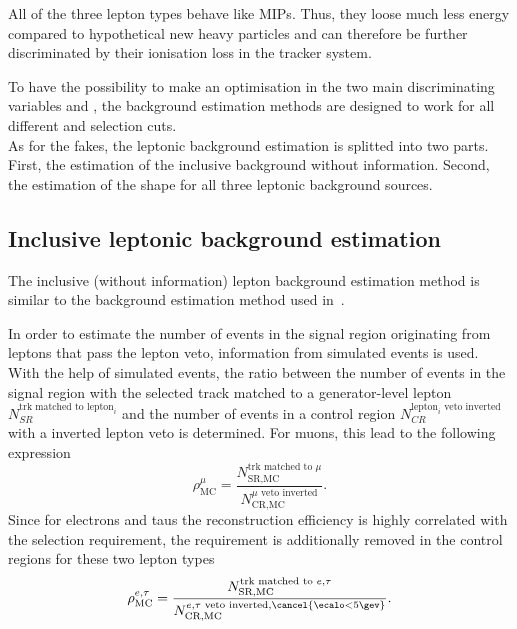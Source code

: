 All of the three lepton types behave like MIPs.
Thus, they loose much less energy compared to hypothetical new heavy particles and can therefore be further discriminated by their ionisation loss in the tracker system.

To have the possibility to make an optimisation in the two main discriminating variables \pt and \ias, the background estimation methods are designed to work for all different \pt and \ias selection cuts.\\





As for the fakes, the leptonic background estimation is splitted into two parts.
First, the estimation of the inclusive background without \ias information.
Second, the estimation of the \ias shape for all three leptonic background sources.

\FloatBarrier
\subsection{Inclusive leptonic background estimation}
The inclusive (without \dedx information) lepton background estimation method is similar to the background estimation method used in~\cite{bib:CMS:DT_Thesis,bib:CMS:DT_8TeV_AN}.

In order to estimate the number of events in the signal region originating from leptons that pass the lepton veto, information from simulated events is used.
With the help of simulated \WJets events, the ratio \leptonscalefactor between the number of events in the signal region with the selected track matched to a generator-level lepton $N_{SR}^{\text{trk matched to lepton}_i}$
 and the number of events in a control region $N_{CR}^{\text{lepton}_i\text{ veto inverted}}$ with a inverted lepton veto is determined.
For muons, this lead to the following expression
\begin{equation*}
\rho_{\text{MC}}^{\mu} = \frac{N_{\text{SR,MC}}^{\text{trk matched to }\mu}}{N_{\text{CR,MC}}^{\mu \text{ veto inverted}}}.
\end{equation*}
Since for electrons and taus the reconstruction efficiency is highly correlated with the \ecalo selection requirement, the \ecalo requirement is additionally removed in the control regions for these two lepton types 
\begin{equation*}
\rho_{\text{MC}}^{e,\tau} = \frac{N_{\text{SR,MC}}^{\text{trk matched to }e,\tau}}{N_{\text{CR,MC}}^{e,\tau\text{ veto inverted}, \cancel{\ecalo<5\gev}}}.
\end{equation*}

